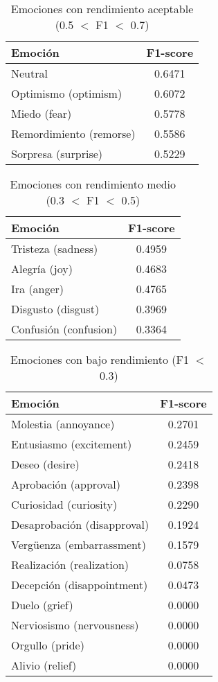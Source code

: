 \documentclass[12pt,a4paper]{report}
\begin{document}
\begin{table}[htbp]
  \centering
  \caption{Emociones con rendimiento aceptable (0.5 $<$ F1 $<$ 0.7)}
  \begin{tabular}{lc}
    \toprule
    \textbf{Emoción} & \textbf{F1-score} \\
    \midrule
    Neutral & 0.6471 \\
    Optimismo (optimism) & 0.6072 \\
    Miedo (fear) & 0.5778 \\
    Remordimiento (remorse) & 0.5586 \\
    Sorpresa (surprise) & 0.5229 \\
    \bottomrule
  \end{tabular}
\end{table}

\begin{table}[htbp]
  \centering
  \caption{Emociones con rendimiento medio (0.3 $<$ F1 $<$ 0.5)}
  \begin{tabular}{lc}
    \toprule
    \textbf{Emoción} & \textbf{F1-score} \\
    \midrule
    Tristeza (sadness) & 0.4959 \\
    Alegría (joy) & 0.4683 \\
    Ira (anger) & 0.4765 \\
    Disgusto (disgust) & 0.3969 \\
    Confusión (confusion) & 0.3364 \\
    \bottomrule
  \end{tabular}
\end{table}

\begin{table}[htbp]
  \centering
  \caption{Emociones con bajo rendimiento (F1 $<$ 0.3)}
  \begin{tabular}{lc}
    \toprule
    \textbf{Emoción} & \textbf{F1-score} \\
    \midrule
    Molestia (annoyance) & 0.2701 \\
    Entusiasmo (excitement) & 0.2459 \\
    Deseo (desire) & 0.2418 \\
    Aprobación (approval) & 0.2398 \\
    Curiosidad (curiosity) & 0.2290 \\
    Desaprobación (disapproval) & 0.1924 \\
    Vergüenza (embarrassment) & 0.1579 \\
    Realización (realization) & 0.0758 \\
    Decepción (disappointment) & 0.0473 \\
    Duelo (grief) & 0.0000 \\
    Nerviosismo (nervousness) & 0.0000 \\
    Orgullo (pride) & 0.0000 \\
    Alivio (relief) & 0.0000 \\
    \bottomrule
  \end{tabular}
\end{table}
\end{document}
